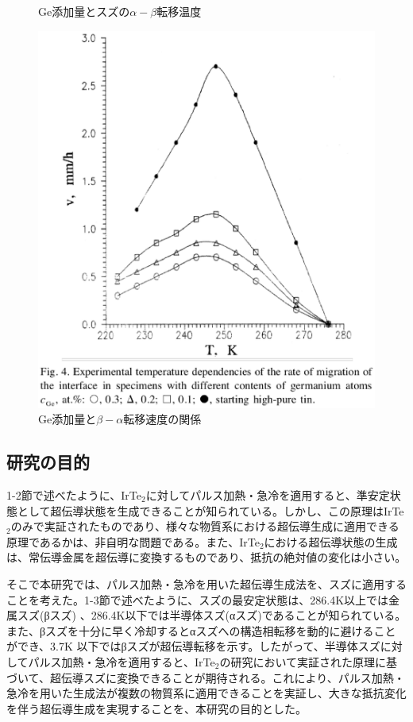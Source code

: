 \begin{figure}[!h]
\begin{minipage}{0.4\hsize}
  \caption{Ge添加量とスズの$\alpha-\beta$転移温度\cite{Vnuk1984}}
  \label{fig:Ge_Stabilized_Sn}
 \end{minipage}
 \begin{minipage}{0.6\hsize}
    \begin{center}
   \includegraphics[width=\hsize]{Introduction/Ge_content.eps}
  \end{center}
  \caption{Ge添加量と$\beta-\alpha$転移速度の関係\cite{Matvienko}}
  \label{fig:Ge_content}
   \end{minipage}
\end{figure}

\subsection{研究の目的}
1-2節で述べたように、IrTe$_2$に対してパルス加熱・急冷を適用すると、準安定状態として超伝導状態を生成できることが知られている。しかし、この原理はIrTe$_2$のみで実証されたものであり、様々な物質系における超伝導生成に適用できる原理であるかは、非自明な問題である。また、IrTe$_2$における超伝導状態の生成は、常伝導金属を超伝導に変換するものであり、抵抗の絶対値の変化は小さい。

そこで本研究では、パルス加熱・急冷を用いた超伝導生成法を、スズに適用することを考えた。1-3節で述べたように、スズの最安定状態は、286.4K以上では金属スズ(βスズ) 、286.4K以下では半導体スズ(αスズ)であることが知られている。また、βスズを十分に早く冷却するとαスズへの構造相転移を動的に避けることができ、3.7K 以下ではβスズが超伝導転移を示す。したがって、半導体スズに対してパルス加熱・急冷を適用すると、IrTe$_2$の研究において実証された原理に基づいて、超伝導スズに変換できることが期待される。これにより、パルス加熱・急冷を用いた生成法が複数の物質系に適用できることを実証し、大きな抵抗変化を伴う超伝導生成を実現することを、本研究の目的とした。

